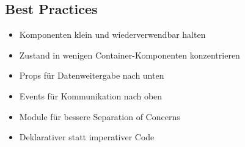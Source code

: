 \subsection{Best Practices}
\begin{itemize}
    \item Komponenten klein und wiederverwendbar halten
    \item Zustand in wenigen Container-Komponenten konzentrieren
    \item Props für Datenweitergabe nach unten
    \item Events für Kommunikation nach oben
    \item Module für bessere Separation of Concerns
    \item Deklarativer statt imperativer Code
\end{itemize}